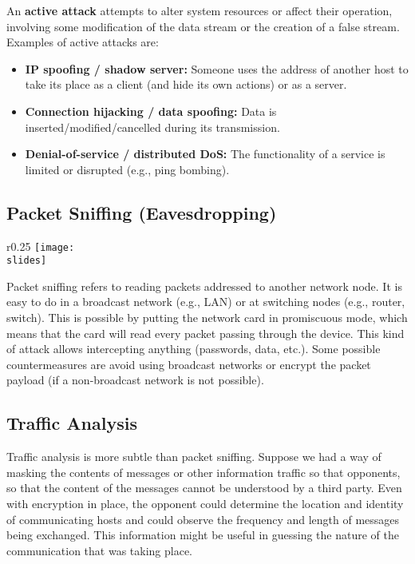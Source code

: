 An \textbf{active attack} attempts to alter system resources or affect their operation, involving some modification of the data stream or the creation of a false stream. Examples of active attacks are:

\begin{itemize}
  \item \textbf{IP spoofing / shadow server:} Someone uses the address of another host to take its place as a client (and hide its own actions) or as a server.
  \item \textbf{Connection hijacking / data spoofing:} Data is inserted/modified/cancelled during its transmission.
  \item \textbf{Denial-of-service / distributed DoS:} The functionality of a service is limited or disrupted (e.g., ping bombing).
\end{itemize}


\subsection{Packet Sniffing (Eavesdropping)}
\begin{wrapfigure}{r}{0.25\textwidth}
  \centering
  \texttt{[image: \\slides]}
\end{wrapfigure}
Packet sniffing refers to reading packets addressed to another network node. It is easy to do in a broadcast network (e.g., LAN) or at switching nodes (e.g., router, switch). This is possible by putting the network card in promiscuous mode, which means that the card will read every packet passing through the device. This kind of attack allows intercepting anything (passwords, data, etc.). Some possible countermeasures are avoid using broadcast networks or encrypt the packet payload (if a non-broadcast network is not possible).


\subsection{Traffic Analysis}
Traffic analysis is more subtle than packet sniffing. Suppose we had a way of masking the contents of messages or other information traffic so that opponents, so that the content of the messages cannot be understood by a third party. Even with encryption in place, the opponent could determine the location and identity of communicating hosts and could observe the frequency and length of messages being exchanged. This information might be useful in guessing the nature of the communication that was taking place.

